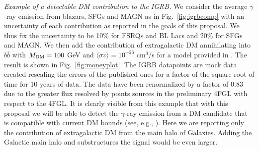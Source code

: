 \documentclass[12 pt]{article}
\begin{document}
{\it Example of a detectable DM contribution to the IGRB.}
We consider the average $\gamma$-ray emission from blazars, SFGs and MAGN as in Fig.~\ref{fig:igrbcomp} with an uncertainty of each contribution as reported in the goals of this proposal. We thus fix the uncertainty to be 10\% for FSRQs and BL Lacs and 20\% for SFGs and MAGN.
We then add the contribution of extragalactic DM annihilating into $b\bar{b}$ with $M_{\rm{DM}}=100$ GeV and $\langle \sigma v \rangle = 10^{-26}$ cm$^3$/s for a model provided in \cite{Cirelli:2010xx}.
The result is shown in Fig.~\ref{fig:moneyplot}. The IGRB datapoints are mock data created rescaling the errors of the published ones \cite{Ackermann:2014usa} for a factor of the square root of time for 10 years of data. The data have been renormalized by a factor of 0.83 due to the greater flux resolved by points sources in the preliminary 4FGL with respect to the 4FGL.
It is clearly visible from this example that with this proposal we will be able to detect the $\gamma$-ray emission from a DM candidate that is compatible with current DM bounds (see, e.g., \cite{Fermi-LAT:2016uux}). Here we are reporting only the contribution of extragalactic DM from the main halo of Galaxies. Adding the Galactic main halo and substructures the signal would be even larger.



\end{document}
